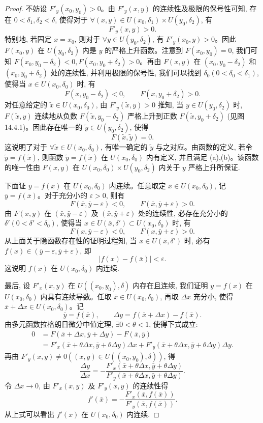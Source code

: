 \begin{proof}
不妨设 $F'_y(x_0,y_0)>0$。由 $F'_y(x,y)$ 的连续性及极限的保号性可知, 存在 $0<\delta_1,\delta_2<\delta$, 使得对于 $\forall(x,y)\in U(x_0,\delta_1)\times U(y_0,\delta_2)$, 有
\[
  F'_y(x,y)>0.
\]
特别地, 若固定 $x=x_0$, 则对于 $\forall y\in U(y_0,\delta_2)$, 有 $F'_y(x_0,y)>0$。因此 $F(x_0,y)$ 在 $U(y_0,\delta_2)$ 内是 $y$ 的严格上升函数。注意到 $F(x_0,y_0)=0$, 我们可知 $F(x_0,y_0-\delta_2)<0,F(x_0,y_0+\delta_2)>0$。再由 $F(x,y)$ 在 $(x_0,y_0-\delta_2)$ 和 $(x_0,y_0+\delta_2)$ 处的连续性, 并利用极限的保号性, 我们可以找到 $\delta_0(0<\delta_0<\delta_1)$, 使得当 $x\in U(x_0,\delta_0)$ 时, 有
\[
  F(x,y_0-\delta_2)<0,\qquad F(x,y_0+\delta_2)>0.
\]
对任意给定的 $\tilde x\in U(x_0,\delta_0)$, 由 $F'_y(\tilde x,y)>0$ 推知, 当 $y\in U(y_0,\delta_2)$ 时, $F(\tilde x,y)$ 连续地从负数 $F(\tilde x,y_0-\delta_2)$ 严格上升到正数 $F(\tilde x,y_0+\delta_2)$ (见图 14.4.1)。因此存在唯一的 $\tilde y\in U(y_0,\delta_2)$, 使得
\[
  F(\tilde x,\tilde y)=0.
\]
这说明了对于 $\forall\tilde x\in U(x_0,\delta_0)$, 有唯一确定的 $\tilde y$ 与之对应。由函数的定义, 若令 $\tilde y=f(\tilde x)$, 则函数 $\tilde y=f(\tilde x)$ 在 $U(x_0,\delta_0)$ 内有定义, 并且满足 (a),(b)。该函数的唯一性由 $F(x,y)$ 在 $U(x_0,\delta_0)\times U(y_0,\delta_2)$ 内关于 $y$ 严格上升所保证.

下面证 $y=f(x)$ 在 $U(x_0,\delta_0)$ 内连续。任意取定 $\bar x\in U(x_0,\delta_0)$, 记 $\bar y=f(\bar x)$。对于充分小的 $\varepsilon>0$, 则有
\[
  F(\bar x,\bar y-\varepsilon)<0,\qquad F(\bar x,\bar y+\varepsilon)>0.
\]
由 $F(x,y)$ 在 $(\bar x,\bar y-\varepsilon)$ 及 $(\bar x,\bar y+\varepsilon)$ 处的连续性, 必存在充分小的 $\delta'(0<\delta'<\delta_0)$, 使得当 $x\in U(\bar x,\delta')\subset U(x_0,\delta_0)$ 时, 有
\[
  F(x,\bar y-\varepsilon)<0,\qquad F(x,\bar y+\varepsilon)>0.
\]
从上面关于隐函数存在性的证明过程知, 当 $x\in U(\bar x,\delta')$ 时, 必有 $f(x)\in(\bar y-\varepsilon,\bar y+\varepsilon)$, 即
\[
  |f(x)-f(\bar x)|<\varepsilon.
\]
这说明 $f(x)$ 在 $U(x_0,\delta_0)$ 内连续.

最后, 设 $F'_x(x,y)$ 在 $U((x_0,y_0),\delta)$ 内存在且连续, 我们证明 $y=f(x)$ 在 $U(x_0,\delta_0)$ 内具有连续导数。任取 $\bar x\in U(x_0,\delta_0)$, 再取 $\Delta x$ 充分小, 使得 $\bar x+\Delta x\in U(x_0,\delta_0)$。记
\[
  \bar y=f(\bar x),\qquad
  \Delta y=f(\bar x+\Delta x)-f(\bar x).
\]
由多元函数拉格朗日微分中值定理, $\exists0<\theta<1$, 使得下式成立:
\[
\begin{aligned}
  0&=F(\bar x+\Delta x,\bar y+\Delta y)-F(\bar x,\bar y)\\
  &=F'_x(\bar x+\theta\Delta x,\bar y+\theta\Delta y)\Delta x
  +F'_y(\bar x+\theta\Delta x,\bar y+\theta\Delta y)\Delta y.
\end{aligned}
\]
再由 $F'_y(x,y)\ne0((x,y)\in U((x_0,y_0),\delta))$, 得
\[
  \frac{\Delta y}{\Delta x}
  =-\frac{F'_x(\bar x+\theta\Delta x,\bar y+\theta\Delta y)}
  {F'_y(\bar x+\theta\Delta x,\bar y+\theta\Delta y)}.
\]
令 $\Delta x\to0$, 由 $F'_x(x,y)$ 及 $F'_y(x,y)$ 的连续性得
\[
  f'(\bar x)=-\frac{F'_x(\bar x,f(\bar x))}{F'_y(\bar x,f(\bar x))}.
\]
从上式可以看出 $f'(x)$ 在 $U(x_0,\delta_0)$ 内连续.
\end{proof}


